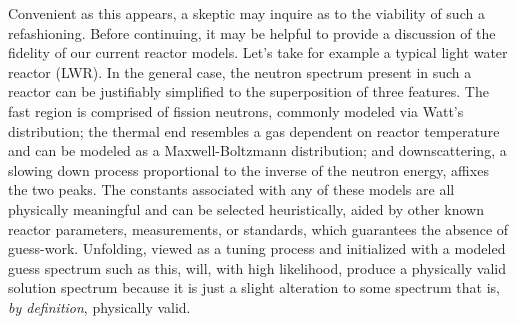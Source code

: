 Convenient as this appears, a skeptic may inquire as to the viability of such a refashioning.
Before continuing, it may be helpful to provide a discussion of the fidelity of our current reactor models.
Let's take for example a typical light water reactor (LWR).
In the general case, the neutron spectrum present in such a reactor can be justifiably simplified to the superposition of three features.
The fast region is comprised of fission neutrons, commonly modeled via Watt's distribution; the thermal end resembles a gas dependent on reactor temperature and can be modeled as a Maxwell-Boltzmann distribution; and downscattering, a slowing down process proportional to the inverse of the neutron energy, affixes the two peaks.
The constants associated with any of these models are all physically meaningful and can be selected heuristically, aided by other known reactor parameters, measurements, or standards, which guarantees the absence of guess-work.
Unfolding, viewed as a tuning process and initialized with a modeled guess spectrum such as this, will, with high likelihood, produce a physically valid solution spectrum because it is just a slight alteration to some spectrum that is, {\it by definition}, physically valid.

